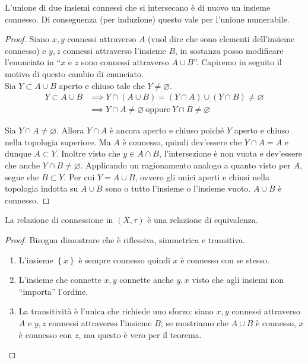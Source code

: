 \begin{theorem}
	L'unione di due insiemi connessi che si intersecano è di nuovo un insieme connesso. Di conseguenza (per induzione) questo vale per l'unione numerabile.
\end{theorem}
\begin{proof}
	Siano $x,y$ connessi attraverso $A$ (vuol dire che sono elementi dell'insieme connesso) e $y,z$ connessi attraverso l'insieme $B$, in sostanza posso modificare l'enunciato in \enquote{$x$ e $z$ sono connessi attraverso $A \cup B$}. Capiremo in seguito il motivo di questo cambio di enunciato.\\
	Sia $Y \subset A \cup B$ aperto e chiuso tale che $Y \neq \varnothing$.
	\begin{align*}
	Y \subset A \cup B & \implies Y \cap (A \cup B) = (Y\cap A)\cup (Y\cap B) \neq \varnothing\\
	& \implies Y \cap A \neq \varnothing \ \text{oppure} \ Y \cap B \neq \varnothing
	\end{align*}
	
	Sia $Y \cap A \neq \varnothing$. Allora $Y \cap A$ è ancora aperto e chiuso poiché $Y$ aperto e chiuso nella topologia superiore. Ma $A$ è connesso, quindi dev'essere che $Y \cap A = A$ e dunque $A \subset Y$. Inoltre visto che $y\in A \cap B$, l'intersezione è non vuota e dev'essere che anche $Y \cap B \neq \varnothing$. Applicando un ragionamento analogo a quanto visto per $A$, segue che $B \subset Y$. Per cui $Y = A \cup B$, ovvero gli unici aperti e chiusi nella topologia indotta su $A \cup B$ sono o tutto l'insieme o l'insieme vuoto. $A \cup B$ è connesso.
\end{proof}

\begin{corollary}
	La relazione di connessione in $(X, \tau)$ è una relazione di equivalenza. 
\end{corollary} 
\begin{proof}
	Bisogna dimostrare che è riflessiva, simmetrica e transitiva.
	\begin{enumerate}
		\item	L'insieme $\left\{x\right\}$ è sempre connesso quindi $x$ è connesso con se stesso.
		\item L'insieme che connette $x,y$ connette anche $y,x$ visto che agli insiemi non \enquote{importa} l'ordine.
		\item La transitività è l'unica che richiede uno sforzo: siano $x,y$ connessi attraverso $A$ e $y,z$ connessi attraverso l'insieme $B$; se mostriamo che $A \cup B$ è connesso, $x$ è connesso con $z$, ma questo è vero per il teorema. 
	\end{enumerate}
\end{proof}


